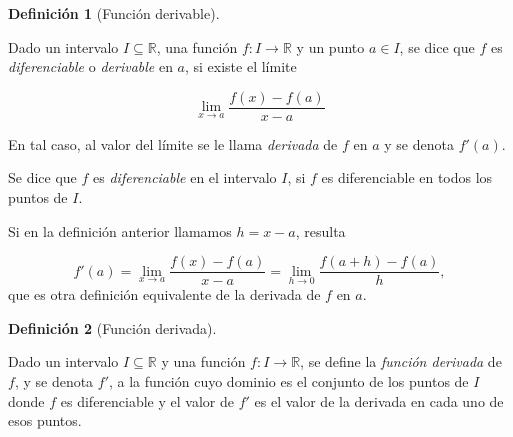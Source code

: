 \documentclass[
  a4paper,
]{scrreport}
\theoremstyle{definition}
\theoremstyle{plain}
\theoremstyle{definition}
\newtheorem{definition}{Definición}[chapter]
\theoremstyle{definition}
\theoremstyle{plain}
\theoremstyle{plain}
\theoremstyle{remark}
\begin{document}
\begin{definition}[Función
derivable]\protect\hypertarget{def-funcion-diferenciable-derivada}{}\label{def-funcion-diferenciable-derivada}

Dado un intervalo \(I\subseteq\mathbb{R}\), una función
\(f:I\to\mathbb{R}\) y un punto \(a\in I\), se dice que \(f\) es
\emph{diferenciable} o \emph{derivable} en \(a\), si existe el límite

\[
\lim_{x\to a}\frac{f(x)-f(a)}{x-a}
\]

En tal caso, al valor del límite se le llama \emph{derivada} de \(f\) en
\(a\) y se denota \(f'(a)\).

Se dice que \(f\) es \emph{diferenciable} en el intervalo \(I\), si
\(f\) es diferenciable en todos los puntos de \(I\).

\end{definition}

\begin{tcolorbox}[enhanced jigsaw, leftrule=.75mm, colbacktitle=quarto-callout-note-color!10!white, toprule=.15mm, opacityback=0, opacitybacktitle=0.6, toptitle=1mm, breakable, bottomtitle=1mm, colframe=quarto-callout-note-color-frame, rightrule=.15mm, titlerule=0mm, title=\textcolor{quarto-callout-note-color}{\faInfo}\hspace{0.5em}{Nota}, arc=.35mm, left=2mm, bottomrule=.15mm, colback=white, coltitle=black]

Si en la definición anterior llamamos \(h=x-a\), resulta

\[
f'(a)=\lim_{x\to a}\frac{f(x)-f(a)}{x-a}=\lim_{h\to 0}\frac{f(a+h)-f(a)}{h},
\] que es otra definición equivalente de la derivada de \(f\) en \(a\).

\end{tcolorbox}

\begin{definition}[Función
derivada]\protect\hypertarget{def-funcion-derivada}{}\label{def-funcion-derivada}

Dado un intervalo \(I\subseteq\mathbb{R}\) y una función
\(f:I\to\mathbb{R}\), se define la \emph{función derivada} de \(f\), y
se denota \(f'\), a la función cuyo dominio es el conjunto de los puntos
de \(I\) donde \(f\) es diferenciable y el valor de \(f'\) es el valor
de la derivada en cada uno de esos puntos.

\end{definition}
\end{document}
